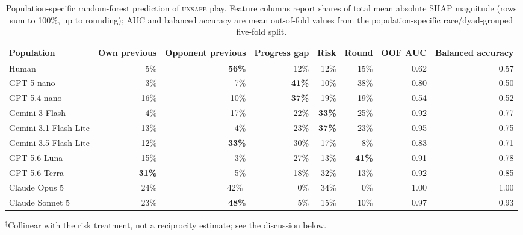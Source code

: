 \documentclass{article}
\newcommand{\Unsafe}{\textsc{unsafe}}
\begin{document}
\begin{table}[t]
    \caption{Population-specific random-forest prediction of \Unsafe{}
    play. Feature columns report shares of total mean absolute SHAP
    magnitude (rows sum to 100\%, up to rounding); AUC and balanced
    accuracy are mean out-of-fold values from the population-specific
    race/dyad-grouped five-fold split.}
    \label{tab:feature-importance}
    \centering
    \footnotesize
    \setlength{\tabcolsep}{4.5pt}
    \begin{tabular}{@{}lrrrrrrr@{}}
        \toprule
        Population
        & Own previous
        & Opponent previous
        & Progress gap
        & Risk
        & Round
        & OOF AUC
        & Balanced accuracy \\
        \midrule
        Human                   & 5\%  & \textbf{56\%} & 12\% & 12\%          & 15\% & 0.62 & 0.57 \\
        GPT-5-nano              & 3\%  & 7\%           & \textbf{41\%} & 10\% & 38\% & 0.80 & 0.50 \\
        GPT-5.4-nano            & 16\% & 10\%          & \textbf{37\%} & 19\% & 19\% & 0.54 & 0.52 \\
        Gemini-3-Flash          & 4\%  & 17\%          & 22\% & \textbf{33\%} & 25\% & 0.92 & 0.77 \\
        Gemini-3.1-Flash-Lite   & 13\% & 4\%           & 23\% & \textbf{37\%} & 23\% & 0.95 & 0.75 \\
        Gemini-3.5-Flash-Lite   & 12\% & \textbf{33\%} & 30\% & 17\%          & 8\%  & 0.83 & 0.71 \\
        GPT-5.6-Luna            & 15\% & 3\%           & 27\% & 13\%          & \textbf{41\%} & 0.91 & 0.78 \\
        GPT-5.6-Terra           & \textbf{31\%} & 5\% & 18\% & 32\% & 13\% & 0.92 & 0.85 \\
        Claude Opus 5           & 24\% & 42\%$^\dagger$ & 0\% & 34\%         & 0\%  & 1.00 & 1.00 \\
        Claude Sonnet 5         & 23\% & \textbf{48\%} & 5\%  & 15\%          & 10\% & 0.97 & 0.93 \\
        \bottomrule
    \end{tabular}

    \vspace{2pt}
    {\footnotesize $^\dagger$Collinear with the risk treatment, not a
    reciprocity estimate; see the discussion below.\par}
\end{table}
\end{document}
